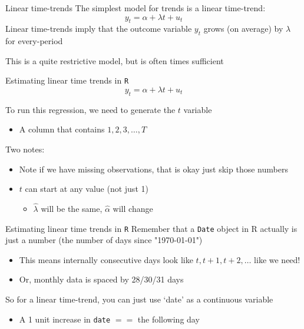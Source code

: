 \documentclass[aspectratio=169,t,11pt,table]{beamer}
\begin{document}
\begin{frame}{Linear time-trends}
  The simplest model for trends is a \alert{linear time-trend}:
  $$
    y_t = \alpha + \lambda t + u_t
  $$
  Linear time-trends imply that the outcome variable $y_t$ grows (on average) by $\lambda$ for every-period

  \bigskip
  This is a quite restrictive model, but is often times sufficient
\end{frame}


\begin{frame}[fragile]{Estimating linear time trends in \texttt{R}}
  \vspace*{-\bigskipamount}
  $$
    y_t = \alpha + \lambda t + u_t
  $$

  To run this regression, we need to generate the $t$ variable
  \begin{itemize}
    \item A column that contains $1, 2, 3, \dots, T$
  \end{itemize}

  \bigskip
  Two notes:
  \begin{itemize}
    \item Note if we have missing observations, that is okay just skip those numbers 

    \item $t$ can start at any value (not just 1)
    \begin{itemize}
      \item $\hat{\lambda}$ will be the same, $\hat{\alpha}$ will change
    \end{itemize}
  \end{itemize}
\end{frame}

\begin{frame}[fragile]{Estimating linear time trends in \texttt{R}}
  Remember that a \texttt{Date} object in R actually is just a number (the number of days since "1970-01-01")
  \begin{itemize}
    \item This means internally consecutive days look like $t, t+1, t+2, \dots$ like we need! 
    \item Or, monthly data is spaced by 28/30/31 days
  \end{itemize}

  \bigskip
  So for a linear time-trend, you can just use `date' as a continuous variable
  \begin{itemize}
    \item A 1 unit increase in \texttt{date} $==$ the following day
  \end{itemize}
\end{frame}
\end{document}
